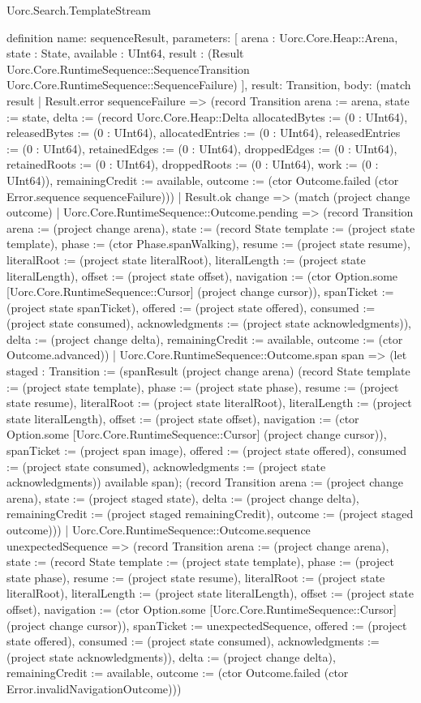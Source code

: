 \begin{lexlean}{Uorc.Search.TemplateStream}
\begin{semanticmodule}
definition{
  name: sequenceResult,
  parameters: [
    arena : Uorc.Core.Heap::Arena,
    state : State,
    available : UInt64,
    result : (Result Uorc.Core.RuntimeSequence::SequenceTransition Uorc.Core.RuntimeSequence::SequenceFailure)
  ],
  result: Transition,
  body: (match result
    | Result.error sequenceFailure => (record Transition {arena := arena, state := state, delta := (record Uorc.Core.Heap::Delta {allocatedBytes := (0 : UInt64), releasedBytes := (0 : UInt64), allocatedEntries := (0 : UInt64), releasedEntries := (0 : UInt64), retainedEdges := (0 : UInt64), droppedEdges := (0 : UInt64), retainedRoots := (0 : UInt64), droppedRoots := (0 : UInt64), work := (0 : UInt64)}), remainingCredit := available, outcome := (ctor Outcome.failed (ctor Error.sequence sequenceFailure))})
    | Result.ok change => (match (project change outcome)
      | Uorc.Core.RuntimeSequence::Outcome.pending => (record Transition {arena := (project change arena), state := (record State {template := (project state template), phase := (ctor Phase.spanWalking), resume := (project state resume), literalRoot := (project state literalRoot), literalLength := (project state literalLength), offset := (project state offset), navigation := (ctor Option.some [Uorc.Core.RuntimeSequence::Cursor] (project change cursor)), spanTicket := (project state spanTicket), offered := (project state offered), consumed := (project state consumed), acknowledgments := (project state acknowledgments)}), delta := (project change delta), remainingCredit := available, outcome := (ctor Outcome.advanced)})
      | Uorc.Core.RuntimeSequence::Outcome.span span => (let staged : Transition := (spanResult (project change arena) (record State {template := (project state template), phase := (project state phase), resume := (project state resume), literalRoot := (project state literalRoot), literalLength := (project state literalLength), offset := (project state offset), navigation := (ctor Option.some [Uorc.Core.RuntimeSequence::Cursor] (project change cursor)), spanTicket := (project span image), offered := (project state offered), consumed := (project state consumed), acknowledgments := (project state acknowledgments)}) available span); (record Transition {arena := (project change arena), state := (project staged state), delta := (project change delta), remainingCredit := (project staged remainingCredit), outcome := (project staged outcome)}))
      | Uorc.Core.RuntimeSequence::Outcome.sequence unexpectedSequence => (record Transition {arena := (project change arena), state := (record State {template := (project state template), phase := (project state phase), resume := (project state resume), literalRoot := (project state literalRoot), literalLength := (project state literalLength), offset := (project state offset), navigation := (ctor Option.some [Uorc.Core.RuntimeSequence::Cursor] (project change cursor)), spanTicket := unexpectedSequence, offered := (project state offered), consumed := (project state consumed), acknowledgments := (project state acknowledgments)}), delta := (project change delta), remainingCredit := available, outcome := (ctor Outcome.failed (ctor Error.invalidNavigationOutcome))})
}
\end{semanticmodule}
\end{lexlean}
